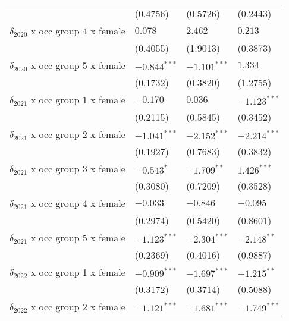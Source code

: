 \begin{tabular}{llll}
                                       &           (0.4756) &           (0.5726) &           (0.2443) \\
$\delta_{2020}$ x occ group 4 x female &            $0.078$ &            $2.462$ &            $0.213$ \\
                                       &           (0.4055) &           (1.9013) &           (0.3873) \\
$\delta_{2020}$ x occ group 5 x female &     $-0.844^{***}$ &     $-1.101^{***}$ &            $1.334$ \\
                                       &           (0.1732) &           (0.3820) &           (1.2755) \\
$\delta_{2021}$ x occ group 1 x female &           $-0.170$ &            $0.036$ &     $-1.123^{***}$ \\
                                       &           (0.2115) &           (0.5845) &           (0.3452) \\
$\delta_{2021}$ x occ group 2 x female &     $-1.041^{***}$ &     $-2.152^{***}$ &     $-2.214^{***}$ \\
                                       &           (0.1927) &           (0.7683) &           (0.3832) \\
$\delta_{2021}$ x occ group 3 x female &         $-0.543^*$ &      $-1.709^{**}$ &      $1.426^{***}$ \\
                                       &           (0.3080) &           (0.7209) &           (0.3528) \\
$\delta_{2021}$ x occ group 4 x female &           $-0.033$ &           $-0.846$ &           $-0.095$ \\
                                       &           (0.2974) &           (0.5420) &           (0.8601) \\
$\delta_{2021}$ x occ group 5 x female &     $-1.123^{***}$ &     $-2.304^{***}$ &      $-2.148^{**}$ \\
                                       &           (0.2369) &           (0.4016) &           (0.9887) \\
$\delta_{2022}$ x occ group 1 x female &     $-0.909^{***}$ &     $-1.697^{***}$ &      $-1.215^{**}$ \\
                                       &           (0.3172) &           (0.3714) &           (0.5088) \\
$\delta_{2022}$ x occ group 2 x female &     $-1.121^{***}$ &     $-1.681^{***}$ &     $-1.749^{***}$ \\

\end{tabular}
